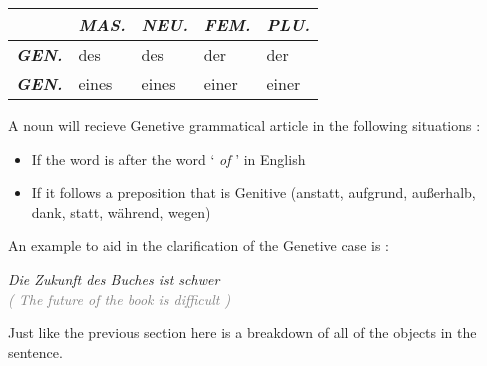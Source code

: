 \documentclass[a4paper,twocolumn,10pt]{article}
\newcommand{\newpar}
{\par \vspace{0.3cm}}
\begin{document}
\begin{tabularx}{0.94\linewidth}{l|XXXX}

		&
		\cellcolor{table-subtopic} \textbf{\textit{MAS.}} &
		\cellcolor{table-subtopic} \textbf{\textit{NEU.}}  &
		\cellcolor{table-subtopic} \textbf{\textit{FEM.}}  &
		\cellcolor{table-subtopic} \textbf{\textit{PLU.}} \\

		\midrule

		\cellcolor{table-subtopic} \textbf{\textit{GEN.}} &
		\cellcolor{cell-lightyellow} des               &
		\cellcolor{cell-lightyellow} des               &
		\cellcolor{cell-lightpurple} der               &
		\cellcolor{cell-lightpurple} der \\

		\midrule

		\cellcolor{table-subtopic} \textbf{\textit{GEN.}} &
		\cellcolor{cell-lightyellow} eines               &
		\cellcolor{cell-lightyellow} eines               &
		\cellcolor{cell-lightpurple} einer               &
		\cellcolor{cell-lightpurple} einer \\


\end{tabularx}

\vspace{0.5cm}

\linenumbers


A noun will recieve Genetive grammatical article in the following situations
:\newpar 
\nolinenumbers
\begin{itemize}[noitemsep]

	\item     If the word is after the word ` \textit{of} ' in English

	\item If it follows a preposition that is Genitive (anstatt, aufgrund,
	außerhalb, dank, statt, während, wegen)

\end{itemize}
\linenumbers

An example to aid in the clarification of the Genetive case is :\newpar


\noindent
\textit{Die Zukunft des Buches ist schwer}\\
\textcolor{gray} { \textit{( The future of the book is difficult )} } \newpar

Just like the previous section here is a breakdown of all of the objects in the
sentence.
\end{document}
